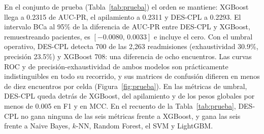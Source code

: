 \documentclass[pdflatex,sn-mathphys-num]{sn-jnl}
\theoremstyle{plain}
\begin{document}
En el conjunto de prueba (Tabla~\ref{tab:prueba}) el orden se mantiene: XGBoost llega a 0.2315 de AUC-PR, el apilamiento a 0.2311 y DES-CPL a 0.2293. El intervalo BCa al 95\% de la diferencia de AUC-PR entre DES-CPL y XGBoost, remuestreando pacientes, es $[-0.0080,\, 0.0033]$ e incluye el cero. Con el umbral operativo, DES-CPL detecta 700 de las 2{,}263 readmisiones (exhaustividad 30.9\%, precisión 23.5\%) y XGBoost 708: una diferencia de ocho encuentros. Las curvas ROC y de precisión-exhaustividad de ambos modelos son prácticamente indistinguibles en todo su recorrido, y sus matrices de confusión difieren en menos de diez encuentros por celda (Figura~\ref{fig:prueba}). En las métricas de umbral, DES-CPL queda detrás de XGBoost, del apilamiento y de los pesos globales por menos de 0.005 en F1 y en MCC. En el recuento de la Tabla~\ref{tab:prueba}, DES-CPL no gana ninguna de las seis métricas frente a XGBoost, y gana las seis frente a Naive Bayes, $k$-NN, Random Forest, el SVM y LightGBM.
\end{document}
